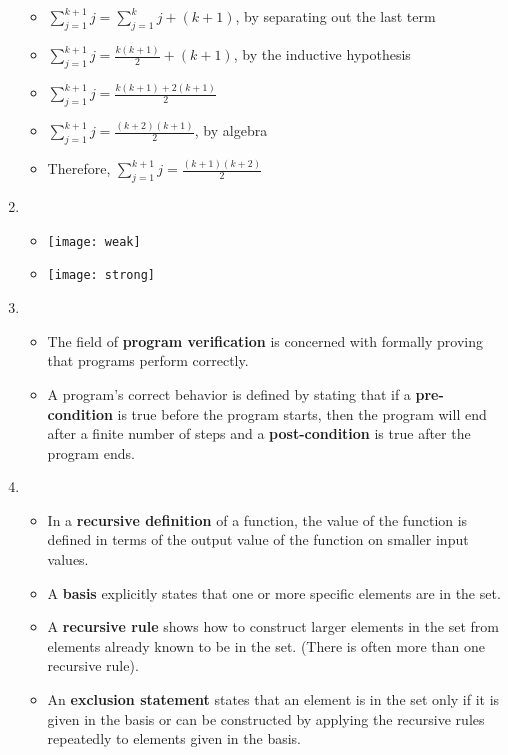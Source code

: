 \documentclass[12pt,a4paper]{article}
\begin{document}
\begin{enumerate}
\begin{itemize}
    \item[] \(\displaystyle\sum_{j=1}^{k+1} j = \displaystyle\sum_{j=1}^{k} j + (k + 1)\), by separating out the last term
    \item[] \(\displaystyle\sum_{j=1}^{k+1} j = \frac{k(k+1)}{2} + (k + 1) \), by the inductive hypothesis
    \item[] \(\displaystyle\sum_{j=1}^{k+1} j = \frac{k(k+1) + 2(k+1)}{2} \)
    \item[] \(\displaystyle\sum_{j=1}^{k+1} j = \frac{(k + 2)(k + 1)}{2} \), by algebra
    \item Therefore, \(\displaystyle\sum_{j=1}^{k+1} j = \frac{(k+1)(k+2)}{2} \) 
  \end{itemize}
  \item {}
  \begin{itemize}
    \item[] \texttt{[image: weak]}
    \item[] \texttt{[image: strong]}
  \end{itemize}
  \item {} 
  \begin{itemize}
    \item The field of \textbf{program verification} is concerned with formally proving that programs perform correctly. 
    \item A program's correct behavior is defined by stating that if a \textbf{pre-condition} is true before the program starts, then the program will end after a finite number of steps and a \textbf{post-condition} is true after the program ends.
  \end{itemize}
  \item {} 
  \begin{itemize}
    \item In a \textbf{recursive definition} of a function, the value of the function is defined in terms of the output value of the function on smaller input values.
    \item A \textbf{basis} explicitly states that one or more specific elements are in the set.
    \item A \textbf{recursive rule} shows how to construct larger elements in the set from elements already known to be in the set. (There is often more than one recursive rule).
    \item An \textbf{exclusion statement} states that an element is in the set only if it is given in the basis or can be constructed by applying the recursive rules repeatedly to elements given in the basis.

\end{itemize}
\end{enumerate}
\end{document}
